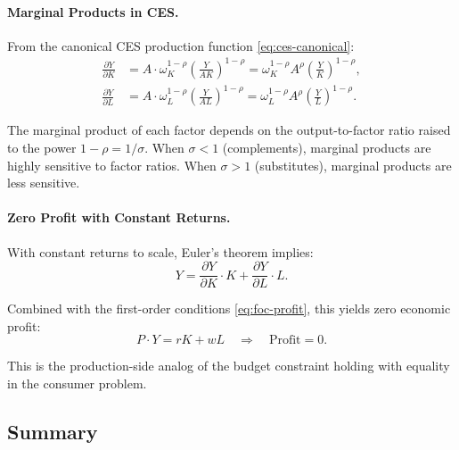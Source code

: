 \paragraph{Marginal Products in CES.}
From the canonical CES production function \cref{eq:ces-canonical}:
\begin{align}
\frac{\partial Y}{\partial K} &= A \cdot \omega_K^{1-\rho} \left( \frac{Y}{AK} \right)^{1-\rho} = \omega_K^{1-\rho} A^\rho \left( \frac{Y}{K} \right)^{1-\rho}, \label{eq:mpk} \\[6pt]
\frac{\partial Y}{\partial L} &= A \cdot \omega_L^{1-\rho} \left( \frac{Y}{AL} \right)^{1-\rho} = \omega_L^{1-\rho} A^\rho \left( \frac{Y}{L} \right)^{1-\rho}. \label{eq:mpl}
\end{align}

The marginal product of each factor depends on the output-to-factor ratio raised to the power $1-\rho = 1/\sigma$. When $\sigma < 1$ (complements), marginal products are highly sensitive to factor ratios. When $\sigma > 1$ (substitutes), marginal products are less sensitive.

\paragraph{Zero Profit with Constant Returns.}
With constant returns to scale, Euler's theorem implies:
\begin{equation}
Y = \frac{\partial Y}{\partial K} \cdot K + \frac{\partial Y}{\partial L} \cdot L.
\label{eq:euler}
\end{equation}

Combined with the first-order conditions \cref{eq:foc-profit}, this yields zero economic profit:
\begin{equation}
P \cdot Y = rK + wL \quad \Longrightarrow \quad \text{Profit} = 0.
\label{eq:zero-profit}
\end{equation}

This is the production-side analog of the budget constraint holding with equality in the consumer problem.

\subsection{Summary}
\label{subsec:two-period-lc-summary}

